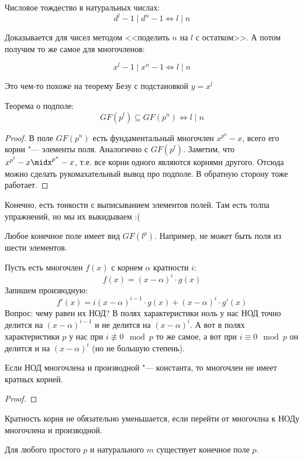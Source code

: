 \begin{lemma}
	Числовое тождество в натуральных числах:
	\[
	d^l - 1 \mid d^n - 1 \iff l \mid n
	\]
\end{lemma}
Доказывается для чисел методом <<поделить $n$ на $l$ с остатком>>.
А потом получим то же самое для многочленов:
\begin{lemma}
	\[
	x^l - 1 \mid x^n - 1 \iff l \mid n
	\]
\end{lemma}
\begin{Rem}
	Это чем-то похоже на теорему Безу с подстановкой $y=x^l$
\end{Rem}

\begin{theorem}
	Теорема о подполе:
	\[
	GF(p^l) \subseteq GF(p^n) \iff l \mid n
	\]
\end{theorem}
\begin{proof}
В поле $GF(p^n)$ есть фундаментальный многочлен $x^{p^n}-x$,
всего его корни "--- элементы поля.
Аналогично с $GF(p^l)$.
Заметим, что $x^{p^l}-x \midx^{p^n}-x$, т.е. все корни
одного являются корнями другого.
Отсюда можно сделать рукомахательный вывод про подполе.
В обратную сторону тоже работает.
\end{proof}
\begin{Rem}
Конечно, есть тонкости с выписыванием элементов полей.
Там есть толпа упражнений, но мы их выкидываем :(
\end{Rem}

\begin{lemma}
	Любое конечное поле имеет вид $GF(l^p)$.
	Например, не может быть поля из шести элементов.
\end{lemma}

Пусть есть многочлен $f(x)$ с корнем $\alpha$ кратности $i$:
\[
	f(x) = (x - \alpha)^i \cdot g(x)
\]
Запишем производную:
\[
	f'(x) = i(x - \alpha)^{i-1} \cdot g(x) + (x - \alpha)^i \cdot g'(x)
\]
Вопрос: чему равен их НОД?
В полях характеристики ноль у нас НОД точно делится на $(x-\alpha)^{i-1}$ и не делится на $(x-\alpha)^i$.
А вот в полях характеристики $p$ у нас при $i \nequiv 0 \mod p$
то же самое, а вот при $i \equiv 0 \mod p$ он делится и на $(x-\alpha)^i$
(но не большую степень).
\begin{conseq}
	Если НОД многочлена и производной "--- константа, то многочлен не имеет кратных корней.
\end{conseq}
\begin{proof}
	\TODO
\end{proof}
\begin{Rem}
	Кратность корня не обязательно уменьшается, если перейти от многочлна к НОДу многочлена и производной.
\end{Rem}
\begin{theorem}
	Для любого простого $p$ и натурального $m$
	существует конечное поле $p$.
\end{theorem}

